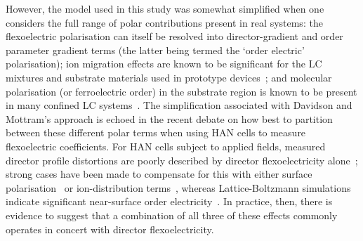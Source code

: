 \documentclass[aps,10pt,twocolumn]{revtex4}
\begin{document}
However, the model used in this study was somewhat simplified when one considers the full range of polar
contributions present in real systems: the flexoelectric polarisation can itself be resolved into
director-gradient and order parameter gradient terms (the latter being termed the `order electric' polarisation);
ion migration effects are known to be significant for the LC mixtures and substrate materials used in prototype
devices~\cite{Cliff}; and molecular polarisation (or ferroelectric order) in the substrate region is known to be
present in many confined LC systems~\cite{Jerome:1991.391,Blinov:2001.183}. The simplification associated with
Davidson and Mottram's approach is echoed in the recent debate on how best to partition between these different
polar terms when using HAN cells to measure flexoelectric coefficients. For HAN cells subject to applied fields,
measured director profile distortions are poorly described by director flexoelectricity
alone~\cite{Mazzulla:2001:021708}; strong cases have been made to compensate for this with either surface
polarisation~\cite{Mazzulla:2003:023702} or ion-distribution terms~\cite{Barbero:2003:023701}, whereas
Lattice-Boltzmann simulations indicate significant near-surface order electricity~\cite{Tim}. In practice, then,
there is evidence to suggest that a combination of all three of these effects commonly operates in concert with
director flexoelectricity.
\end{document}
